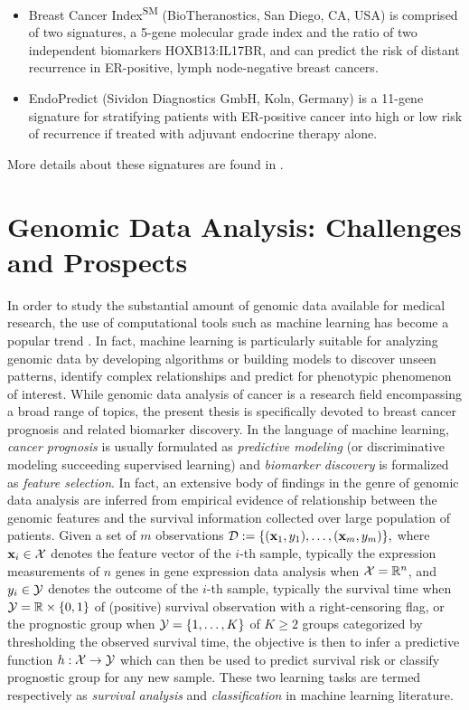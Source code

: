 \begin{itemize}
	\item Breast Cancer Index\textsuperscript{SM} (BioTheranostics, San Diego, CA, USA) \cite{Ma2008five} is comprised of two signatures, a 5-gene molecular grade index and the ratio of two independent biomarkers HOXB13:IL17BR, and can predict the risk of distant recurrence in ER-positive, lymph node-negative breast cancers.
	\item EndoPredict\textsuperscript{\textregistered} (Sividon Diagnostics GmbH, Koln, Germany) \cite{Filipits2011new} is a 11-gene signature for stratifying patients with ER-positive cancer into high or low risk of recurrence if treated with adjuvant endocrine therapy alone.
\end{itemize}
More details about these signatures are found in \cite{Gyorffy2015Multigene}.




\section{Genomic Data Analysis: Challenges and Prospects}

In order to study the substantial amount of genomic data available for medical research, the use of computational tools such as machine learning has become a popular trend \cite{Barillot2012Computational}. In fact, machine learning is particularly suitable for analyzing genomic data by developing algorithms or building models to discover unseen patterns, identify complex relationships and predict for phenotypic phenomenon of interest. While genomic data analysis of cancer is a research field encompassing a broad range of topics, the present thesis is specifically devoted to breast cancer prognosis and related biomarker discovery. In the language of machine learning, \textit{cancer prognosis} is usually formulated as \textit{predictive modeling} (or discriminative modeling succeeding supervised learning) and \textit{biomarker discovery} is formalized as \textit{feature selection}. In fact, an extensive body of findings in the genre of genomic data analysis are inferred from empirical evidence of relationship between the genomic features and the survival information collected over large population of patients. Given a set of $m$ observations $\mathcal{D} := \{ (\mathbf{x}_1 , y_1), \dots, (\mathbf{x}_m , y_m) \},$ where $\mathbf{x}_i \in \mathcal{X}$ denotes the feature vector of the $i$-th sample, typically the expression measurements of $n$ genes in gene expression data analysis when $\mathcal{X} = \mathbb{R}^n$, and $y_i \in \mathcal{Y}$ denotes the outcome of the $i$-th sample, typically the survival time when $\mathcal{Y} = \mathbb{R} \times \{0,1\}$ of (positive) survival observation with a right-censoring flag, or the prognostic group when $\mathcal{Y} = \{1,\dots,K\}$ of $K \geq 2$ groups categorized by thresholding the observed survival time, the objective is then to infer a predictive function $h : \mathcal{X} \to \mathcal{Y}$ which can then be used to predict survival risk or classify prognostic group for any new sample. These two learning tasks are termed respectively as \textit{survival analysis} and \textit{classification} in machine learning literature.


